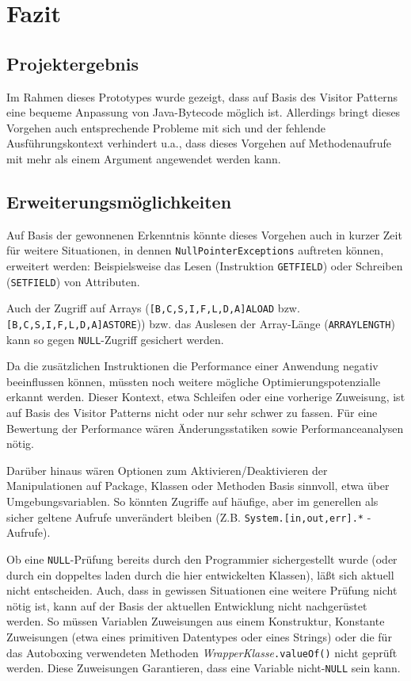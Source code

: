 
\chapter{Fazit}

\section{Projektergebnis}

Im Rahmen dieses Prototypes wurde gezeigt, dass auf Basis des Visitor Patterns
eine bequeme Anpassung von Java-Bytecode möglich ist. Allerdings bringt
dieses Vorgehen auch entsprechende Probleme mit sich und der fehlende
Ausführungskontext verhindert u.a., dass dieses Vorgehen auf Methodenaufrufe
mit mehr als einem Argument angewendet werden kann.


\section{Erweiterungsmöglichkeiten}

Auf Basis der gewonnenen Erkenntnis könnte dieses Vorgehen auch in kurzer Zeit
für weitere Situationen, in dennen \texttt{NullPointerExceptions} auftreten können,
erweitert werden:
Beispielsweise das Lesen (Instruktion \texttt{GETFIELD}) oder
Schreiben (\texttt{SETFIELD}) von Attributen.

Auch der Zugriff auf Arrays (\texttt{[B,C,S,I,F,L,D,A]ALOAD} bzw. \texttt{[B,C,S,I,F,L,D,A]ASTORE}))
bzw. das Auslesen der Array-Länge (\texttt{ARRAYLENGTH}) kann so gegen \texttt{NULL}-Zugriff gesichert werden.

Da die zusätzlichen Instruktionen die Performance einer Anwendung negativ beeinflussen
können, müssten noch weitere mögliche Optimierungspotenzialle erkannt werden. Dieser Kontext,
etwa Schleifen oder eine vorherige Zuweisung, ist auf Basis des Visitor Patterns
nicht oder nur sehr schwer zu fassen.
Für eine Bewertung der Performance wären Änderungsstatiken sowie Performanceanalysen nötig.

Darüber hinaus wären Optionen zum Aktivieren/Deaktivieren der Manipulationen auf Package,
Klassen oder Methoden Basis sinnvoll, etwa über Umgebungsvariablen.
So könnten Zugriffe auf häufige, aber im generellen als sicher geltene Aufrufe
unverändert bleiben (Z.B. \texttt{System.[in,out,err].*} - Aufrufe).

Ob eine \texttt{NULL}-Prüfung bereits durch den Programmier sichergestellt wurde
(oder durch ein doppeltes laden durch die hier entwickelten Klassen), läßt sich
aktuell nicht entscheiden. Auch, dass in gewissen Situationen eine weitere Prüfung
nicht nötig ist, kann auf der Basis der aktuellen Entwicklung nicht nachgerüstet werden.
So müssen Variablen Zuweisungen aus einem Konstruktur, Konstante Zuweisungen (etwa eines
primitiven Datentypes oder eines Strings) oder die für das Autoboxing
verwendeten Methoden \emph{WrapperKlasse}\texttt{.valueOf()} nicht geprüft werden.
Diese Zuweisungen Garantieren, dass eine Variable nicht-\texttt{NULL} sein kann.




